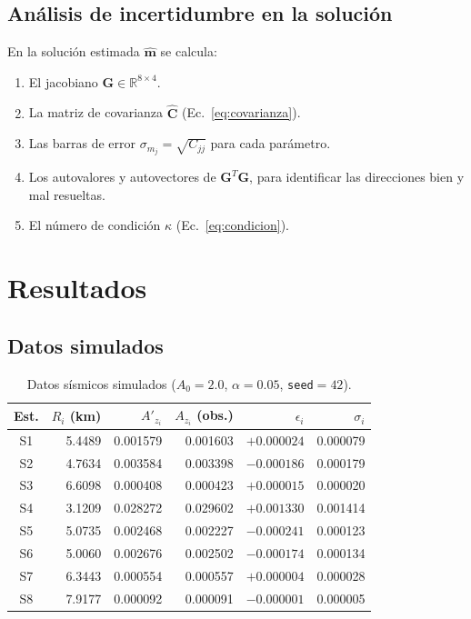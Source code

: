 \documentclass[12pt, a4paper]{article}
\begin{document}
\subsection{Análisis de incertidumbre en la solución}

En la solución estimada $\hat{\mathbf{m}}$ se calcula:
\begin{enumerate}[itemsep=2pt]
    \item El jacobiano $\mathbf{G} \in \mathbb{R}^{8\times 4}$.
    \item La matriz de covarianza $\widehat{\mathbf{C}}$
    (Ec.~\ref{eq:covarianza}).
    \item Las barras de error $\sigma_{m_j} = \sqrt{C_{jj}}$ para
    cada parámetro.
    \item Los autovalores y autovectores de $\mathbf{G}^T\mathbf{G}$,
    para identificar las direcciones bien y mal resueltas.
    \item El número de condición $\kappa$ (Ec.~\ref{eq:condicion}).
\end{enumerate}

\section{Resultados}

\subsection{Datos simulados}

\begin{table}[H]
    \centering
    \caption{Datos sísmicos simulados ($A_0=2.0$, $\alpha=0.05$,
    \texttt{seed}$=42$).}
    \label{tab:datos}
    \begin{tabular}{crrrrr}
        \toprule
        \textbf{Est.} & $R_i$ (km) & $A'_{z_i}$ & $A_{z_i}$ (obs.) &
        $\epsilon_i$ & $\sigma_i$ \\
        \midrule
        S1 & 5.4489 & 0.001579 & 0.001603 & $+0.000024$ & 0.000079 \\
        S2 & 4.7634 & 0.003584 & 0.003398 & $-0.000186$ & 0.000179 \\
        S3 & 6.6098 & 0.000408 & 0.000423 & $+0.000015$ & 0.000020 \\
        S4 & 3.1209 & 0.028272 & 0.029602 & $+0.001330$ & 0.001414 \\
        S5 & 5.0735 & 0.002468 & 0.002227 & $-0.000241$ & 0.000123 \\
        S6 & 5.0060 & 0.002676 & 0.002502 & $-0.000174$ & 0.000134 \\
        S7 & 6.3443 & 0.000554 & 0.000557 & $+0.000004$ & 0.000028 \\
        S8 & 7.9177 & 0.000092 & 0.000091 & $-0.000001$ & 0.000005 \\
        \bottomrule
    \end{tabular}
\end{table}
\end{document}
